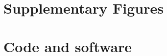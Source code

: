 \documentclass[11pt]{book} %
\begin{document}
\appendix

\setcounter{figure}{0}
\renewcommand{\thefigure}{\Alph{chapter}\arabic{figure}}

\chapter{Supplementary Figures}


\chapter{Code and software}








\end{document}
